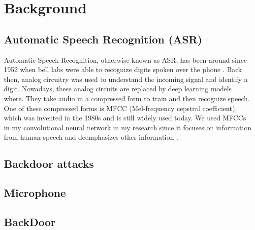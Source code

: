 \documentclass{report}
\theoremstyle{definition}
\theoremstyle{remark}
\begin{document}
\chapter{Background}
\section{Automatic Speech Recognition (ASR)}
Automatic Speech Recognition, otherwise known as ASR, has been around since 1952 when bell labs were able to recognize digits spoken over the phone \cite{ASRHistory}. Back then, analog circuitry was used to understand the incoming signal and identify a digit. Nowadays, these analog circuits are replaced by deep learning models where. They take audio in a compressed form to train and then recognize speech. One of these compressed forms is MFCC (Mel-frequency cepstral coefficient), which was invented in the 1980s and is still widely used today. We used MFCCs in my convolutional neural network in my research since it focuses on information from human speech and deemphasizes other information \cite{dave2013feature}.
\section{Backdoor attacks}

\section{Microphone}
\section{BackDoor}
\cite{roy_backdoor_2017}
\end{document}
